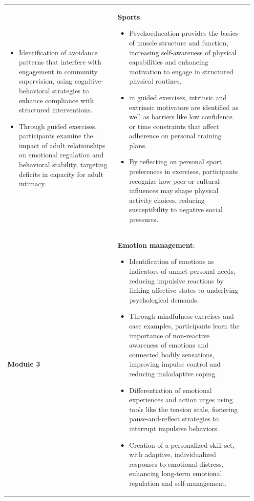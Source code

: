 \documentclass[
  super,
  preprint,
  1p,
  onecolumn]{elsarticle}
\begin{document}
\begin{table}
{\begin{tabular*}{\linewidth}{@{\extracolsep{\fill}}lll}
\begin{itemize}
\item Identification of avoidance patterns that interfere with engagement in community supervision, using cognitive-behavioral strategies to enhance compliance with structured interventions.

\item Through guided exercises, participants examine the impact of adult relationships on emotional regulation and behavioral stability, targeting deficits in capacity for adult intimacy.

\end{itemize} & \textbf{Sports}:

\begin{itemize}
\item Psychoeducation provides the basics of muscle structure and function, increasing self-awareness of physical capabilities and enhancing motivation to engage in structured physical routines.

\item in guided exercises, intrinsic and extrinsic motivators are identified as well as barriers like low confidence or time constraints that affect adherence on personal training plans.

\item By reflecting on personal sport preferences in exercises, participants recognize how peer or cultural influences may shape physical activity choices, reducing susceptibility to negative social pressures.

\end{itemize} \\ 
\textbf{Module 3} & \textbf{Emotion management}:

\begin{itemize}
\item Identification of emotions as indicators of unmet personal needs, reducing impulsive reactions by linking affective states to underlying psychological demands.

\item Through mindfulness exercises and case examples, participants learn the importance of non-reactive awareness of emotions and connected bodily sensations, improving impulse control and reducing maladaptive coping.

\item Differentiation of emotional experiences and action urges using tools like the tension scale, fostering pause-and-reflect strategies to interrupt impulsive behaviors.

\item Creation of a personalized skill set, with adaptive, individualized responses to emotional distress, enhancing long-term emotional regulation and self-management.


\end{itemize}
\end{tabular*}}
\end{table}
\end{document}
